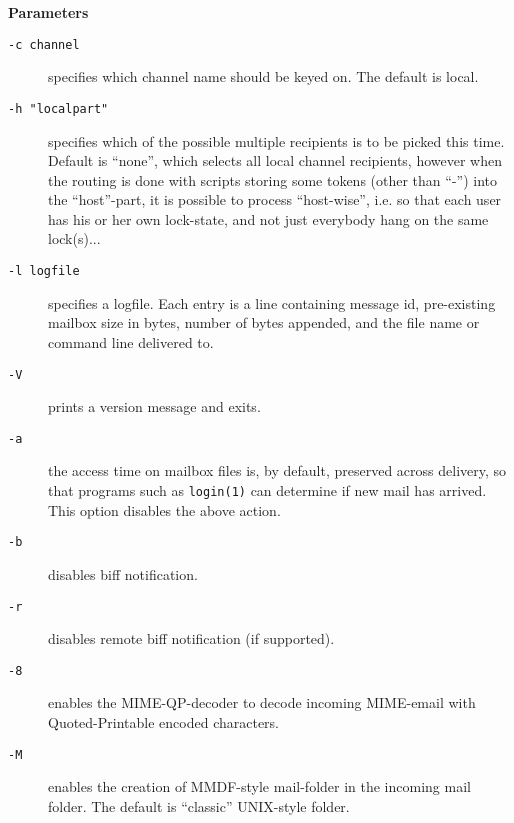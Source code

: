 {\bf Parameters}

\begin{description}
\item[{\tt -c channel}] \mbox{}

specifies which channel name should be keyed on. 
The default is local.

\item[{\tt -h "localpart"}] \mbox{}

specifies which of the possible multiple recipients is to 
be picked this time. Default is ``none'', which selects all local channel recipients, 
however when the routing is done with scripts storing some tokens (other than ``-'') 
into the ``host''-part, it is possible to process ``host-wise'', i.e. so that each 
user has his or her own lock-state, and not just everybody hang on the same lock(s)...

\item[{\tt -l logfile}] \mbox{}

specifies a logfile. Each entry is a line containing message 
id, pre-existing mailbox size in bytes, number of bytes appended, and the file name or 
command line delivered to.

\item[{\tt -V}] \mbox{}

prints a version message and exits.

\item[{\tt -a}] \mbox{}

the access time on mailbox files is, by default, preserved across
delivery, so that programs such as {\tt login(1)} can determine if new
mail has arrived. This option disables the above action.

\item[{\tt -b}] \mbox{}

disables biff notification.

\item[{\tt -r}] \mbox{}

disables remote biff notification (if supported).

\item[{\tt -8}] \mbox{}

enables the MIME-QP-decoder to decode incoming  MIME-email with
Quoted-Printable encoded characters.

\item[{\tt -M}] \mbox{}

enables the creation of MMDF-style mail-folder in the  incoming
mail folder. The default is ``classic'' UNIX-style folder.

\end{description}


